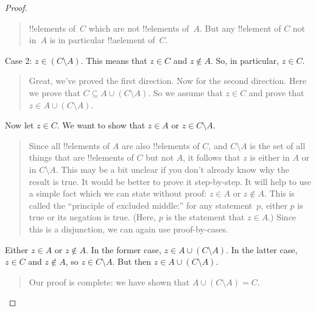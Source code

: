 \documentclass[../../../include/open-logic-section]{subfiles}
\begin{document}
\begin{proof}
\begin{quote}
    !!{element}s of~$C$ which are not !!{element}s of~$A$.  But any
    !!{element} of $C$ not in~$A$ is in particular !!a{element} of~$C$.
  \end{quote}
  Case 2: $z \in (C \setminus A)$.  This means that $z \in C$ and $z
  \notin A$. So, in particular, $z \in C$.
  \begin{quote}
    Great, we've proved the first direction. Now for the second
    direction. Here we prove that $C \subseteq A \cup (C \setminus
    A)$.  So we assume that $z \in C$ and prove that $z \in A \cup (C
    \setminus A)$.
  \end{quote}
  Now let $z \in C$. We want to show that $z \in A$ or $z \in C
  \setminus A$.
  \begin{quote}
    Since all !!{element}s of $A$ are also !!{element}s of $C$, and $C
    \setminus A$ is the set of all things that are !!{element}s of $C$
    but not $A$, it follows that $z$ is either in $A$ or in $C
    \setminus A$.  This may be a bit unclear if you don't already know
    why the result is true.  It would be better to prove it
    step-by-step.  It will help to use a simple fact which we can
    state without proof: $z \in A$ or $z \notin A$. This is called the
    ``principle of excluded middle:'' for any statement~$p$, either
    $p$ is true or its negation is true. (Here, $p$ is the statement
    that $z \in A$.)  Since this is a disjunction, we can again use
    proof-by-cases.
  \end{quote}
  Either $z \in A$ or $z \notin A$. In the former case, $z \in A \cup
  (C \setminus A)$. In the latter case, $z \in C$ and $z \notin A$, so
  $z \in C \setminus A$.  But then $z \in A \cup (C \setminus A)$.
  \begin{quote}
    Our proof is complete: we have shown that $A \cup (C \setminus A) = C$.
    \qedhere
  \end{quote}
\end{proof}
\end{document}

